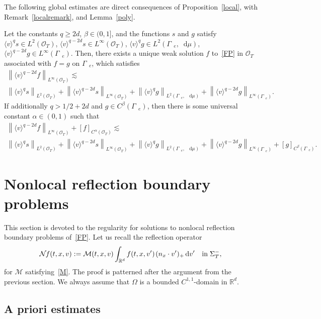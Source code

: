 \documentclass[10pt]{amsart}
\theoremstyle{definition}\newtheorem{defi}[theo]{Definition}\newtheorem{rema}[theo]{Remark}\newtheorem{exam}[theo]{Example}\newtheorem{exem}[theo]{Example}\newtheorem{nota}[theo]{Notation}
\newcommand*{\dif}{\mathop{}\!\mathrm{d}}
\newcommand*\R {\mathbb{R}}
\newcommand*\M {{\mathcal{M}}}
\newcommand*\NN {{\mathcal{N}\hspace{-.3mm}}}
\newcommand*\Ge {\Gamma_{\;\!\!\;\!\!e}}
\newcommand*\OO {\mathcal{O}}
\newcommand{\lv}{\langle v\rangle}
\begin{document}
The following global estimates are direct consequences of Proposition~\ref{local}, with Remark~\ref{localremark}, and Lemma~\ref{poly}.

\begin{prop}\label{global}
Let the constants $q\ge 2d$, $\beta\in(0,1]$, and the functions $s$ and $g$ satisfy $\lv^qs\in L^2(\OO_T)$, $\lv^{q-2d}s\in L^\infty(\OO_T)$, $\lv^qg\in L^2(\Ge,\dif\mu)$, $\lv^{q-2d}g\in L^\infty(\Ge)$. Then, there exists a unique weak solution $f$ to~\eqref{FP} in $\OO_T$ associated with $f=g$ on $\Ge$, which satisfies
\begin{multline*}
\left\|\lv^{q-2d}f\right\|_{L^\infty(\OO_T)}
\lesssim\\
\left\|\lv^{q}s\right\|_{L^2(\OO_T)} + \left\|\lv^{q-2d}s\right\|_{L^\infty(\OO_T)}
+ \left\|\lv^{q}g\right\|_{L^2(\Ge,\;\!\dif\mu)} + \left\|\lv^{q-2d}g\right\|_{L^\infty(\Ge)}.
\end{multline*}
If additionally $q>1/2+2d$ and $g\in C^\beta(\Ge)$, then there is some universal constant $\alpha\in(0,1)$ such that
\begin{multline*}
\left\|\lv^{q-2d}f\right\|_{L^\infty(\OO_T)} +[f]_{C^\alpha(\OO_T)}
\lesssim\\
\left\|\lv^{q}s\right\|_{L^2(\OO_T)} + \left\|\lv^{q-2d}s\right\|_{L^\infty(\OO_T)}
+\left\|\lv^{q}g\right\|_{L^2(\Ge,\;\!\dif\mu)} + \left\|\lv^{q-2d}g\right\|_{L^\infty(\Ge)} + [g]_{C^\beta(\Ge)}.
\end{multline*}
\end{prop}

\section{Nonlocal reflection boundary problems}\label{diffuse}
This section is devoted to the regularity for solutions to nonlocal reflection boundary problems of~\eqref{FP}. Let us recall the reflection operator
\begin{align*}
\NN f(t,x,v):=\M(t,x,v)\int_{\R^d}f(t,x,v')\;\!(n_x\cdot v')_+\dif v'{\quad\rm in}\;\Sigma_T^-,
\end{align*}
for $\M$ satisfying~\eqref{M}. The proof is patterned after the argument from the previous section. We always assume that $\Omega$ is a bounded $C^{1,1}$-domain in $\R^d$.

\subsection{A priori estimates}
\end{document}
